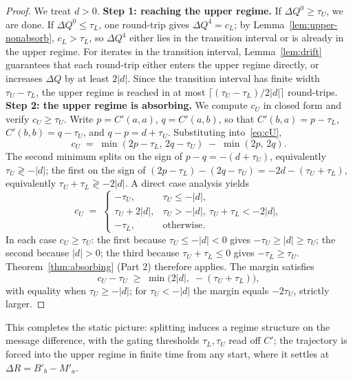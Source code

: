 \begin{proof}
We treat $d > 0$.
\textbf{Step 1: reaching the upper regime.}  If $\Delta Q^0 \geq \tau_U$, we are done.  If $\Delta Q^0 \leq \tau_L$, one round-trip gives $\Delta Q^4 = c_L$; by Lemma~\ref{lem:upper-nonabsorb}, $c_L > \tau_L$, so $\Delta Q^4$ either lies in the transition interval or is already in the upper regime.
For iterates in the transition interval, Lemma~\ref{lem:drift} guarantees that each round-trip either enters the upper regime directly, or increases $\Delta Q$ by at least $2|d|$.  Since the transition interval has finite width $\tau_U - \tau_L$, the upper regime is reached in at most $\lceil(\tau_U - \tau_L)/2|d|\rceil$ round-trips.
\textbf{Step 2: the upper regime is absorbing.}  We compute $c_U$ in closed form and verify $c_U \geq \tau_U$.  Write $p = C'(a,a)$, $q = C'(a,b)$, so that $C'(b,a) = p-\tau_L$, $C'(b,b) = q-\tau_U$, and $q-p = d+\tau_U$.  Substituting into~\eqref{eq:cU},
\[
    c_U \;=\; \min(2p-\tau_L,\, 2q-\tau_U) \;-\; \min(2p,\, 2q).
\]
The second minimum splits on the sign of $p-q = -(d+\tau_U)$, equivalently $\tau_U \gtrless -|d|$; the first on the sign of $(2p-\tau_L)-(2q-\tau_U) = -2d - (\tau_U+\tau_L)$, equivalently $\tau_U+\tau_L \gtrless -2|d|$.  A direct case analysis yields
\[
    c_U \;=\;
    \begin{cases}
        -\tau_U, & \tau_U \leq -|d|,\\[2pt]
        \tau_U + 2|d|, & \tau_U > -|d|,\ \tau_U+\tau_L < -2|d|,\\[2pt]
        -\tau_L, & \text{otherwise.}
    \end{cases}
\]
In each case $c_U \geq \tau_U$: the first because $\tau_U \leq -|d| < 0$ gives $-\tau_U \geq |d| \geq \tau_U$; the second because $|d|>0$; the third because $\tau_U+\tau_L \leq 0$ gives $-\tau_L \geq \tau_U$.  Theorem~\ref{thm:absorbing} (Part 2) therefore applies.  The margin satisfies
\[
    c_U - \tau_U \;\geq\; \min\!\bigl(2|d|,\; -(\tau_U+\tau_L)\bigr),
\]
with equality when $\tau_U \geq -|d|$; for $\tau_U < -|d|$ the margin equals $-2\tau_U$, strictly larger.  \qedhere
\end{proof}
This completes the static picture: splitting induces a regime structure on the message difference, with the gating thresholds $\tau_L, \tau_U$ read off $C'$; the trajectory is forced into the upper regime in finite time from any start, where it settles at $\Delta R = B'_b - M'_a$.
